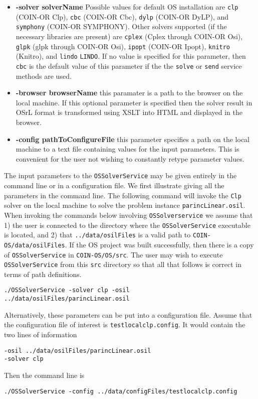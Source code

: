 \documentclass[11pt]{article}
\renewcommand{\_}{{\char"5F}}
\renewcommand{\{}{{\char"7B}}
\renewcommand{\}}{{\char"7D}}
\renewcommand{\^}{{\char"0D}}
\renewcommand{\'}{{\char"0D}}
\begin{document}
\begin{itemize}
\item[] {\bf -solver  solverName}  Possible values for default OS installation are {\tt clp} (COIN-OR Clp), {\tt cbc} (COIN-OR Cbc), {\tt dylp} (COIN-OR DyLP), and {\tt symphony} (COIN-OR SYMPHONY). Other solvers supported (if the necessary libraries are present) are {\tt cplex} (Cplex through COIN-OR Osi), {\tt glpk} (glpk through COIN-OR Osi), {\tt ipopt} (COIN-OR Ipopt),  {\tt knitro} (Knitro), and {\tt lindo} {\tt LINDO}. If no value is specified for this parameter, then {\tt cbc} is the default value of this parameter if the the {\tt solve} or {\tt send} service methods are used.


\item[] {\bf -browser  browserName} this paramater is a path to the browser on the local machine. If this optional parameter is specified then the solver result in OSrL format is transformed using XSLT into HTML and displayed in the browser.

\item[] {\bf -config pathToConfigureFile} this parameter specifies a path on the local machine to a text file containing values for the input parameters. This is convenient for the user not wishing to constantly retype parameter values.

\end{itemize}



The input parameters to the {\tt OSSolverService} may be given entirely in the command line or in a configuration file.  We first illustrate giving all the  parameters in the command line. The following command will invoke the {\tt Clp} solver on the local machine to solve the problem instance {\tt parincLinear.osil}.  When invoking the commands below involving {\tt OSSolverservice} we assume that 1) the user is connected to the directory where the {\tt OSSolverService} executable is located, and 2) that {\tt ../data/osilFiles} is a valid path to {\tt COIN-OS/data/osilFiles}.  If the OS project was built successfully, then there is a copy of  {\tt OSSolverService} in {\tt COIN-OS/OS/src}. The user may wish to execute {\tt OSSolverService} from this {\tt src} directory so that all that follows is correct in terms of path definitions.


\begin{verbatim}
./OSSolverService -solver clp -osil ../data/osilFiles/parincLinear.osil
\end{verbatim}

Alternatively, these parameters can be put into a configuration file. Assume that the configuration file of interest is {\tt testlocalclp.config}. It would contain the two lines of information
\begin{verbatim}
-osil ../data/osilFiles/parincLinear.osil
-solver clp
\end{verbatim}
Then the command line is
\begin{verbatim}
./OSSolverService -config ../data/configFiles/testlocalclp.config
\end{verbatim}
\end{document}
